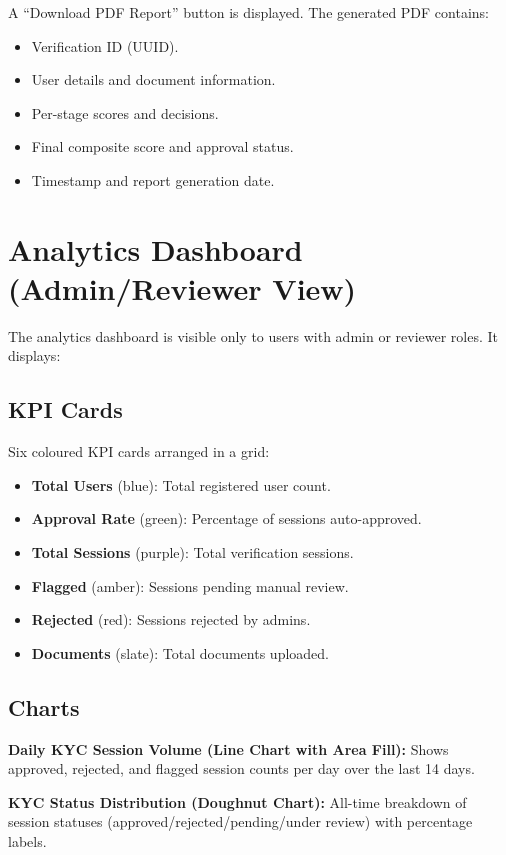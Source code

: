 A ``Download PDF Report'' button is displayed. The generated PDF contains:
\begin{itemize}
    \item Verification ID (UUID).
    \item User details and document information.
    \item Per-stage scores and decisions.
    \item Final composite score and approval status.
    \item Timestamp and report generation date.
\end{itemize}

\section{Analytics Dashboard (Admin/Reviewer View)}

The analytics dashboard is visible only to users with admin or reviewer roles. It displays:

\subsection{KPI Cards}
Six coloured KPI cards arranged in a grid:
\begin{itemize}
    \item \textbf{Total Users} (blue): Total registered user count.
    \item \textbf{Approval Rate} (green): Percentage of sessions auto-approved.
    \item \textbf{Total Sessions} (purple): Total verification sessions.
    \item \textbf{Flagged} (amber): Sessions pending manual review.
    \item \textbf{Rejected} (red): Sessions rejected by admins.
    \item \textbf{Documents} (slate): Total documents uploaded.
\end{itemize}

\subsection{Charts}

\textbf{Daily KYC Session Volume (Line Chart with Area Fill):} Shows approved, rejected, and flagged session counts per day over the last 14 days.

\textbf{KYC Status Distribution (Doughnut Chart):} All-time breakdown of session statuses (approved/rejected/pending/under review) with percentage labels.

